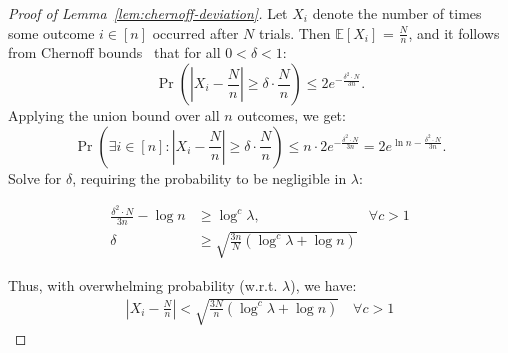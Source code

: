 \begin{proof}[Proof of Lemma~\ref{lem:chernoff-deviation}]

Let $X_i$ denote the number of times some outcome $i \in [n]$ occurred after $N$ trials. Then $\mathbb{E}[X_i]$ = $\frac{N}{n}$, and it follows from Chernoff bounds~\cite[Cor.~4.6]{MU05} that for all $0 < \delta < 1$:
$$
\Pr\left(|X_i - \frac{N}{n}| \geq \delta \cdot \frac{N}{n} \right) \leq 2 e^{-\frac{\delta^2 \cdot N}{3n}}.
$$
Applying the union bound over all $n$ outcomes, we get:
$$
\Pr\left(\exists i \in [n]: |X_i - \frac{N}{n}| \geq \delta \cdot \frac{N}{n} \right) \leq n \cdot 2 e^{-\frac{\delta^2 \cdot N}{3n}} = 2 e^{\ln n -\frac{\delta^2 \cdot N}{3n}}.
$$
Solve for $\delta$, requiring the probability to be negligible in $\lambda$:

\begin{align*}
\frac{\delta^2 \cdot N}{3n} - \log n &\geq \log^c \lambda, &\forall c > 1\\
\delta &\geq \sqrt{\frac{3n}{N}(\log^c \lambda + \log n)} &
\end{align*}

Thus, with overwhelming probability (w.r.t. $\lambda$), we have:
\begin{align*}
    \left|X_i - \frac{N}{n}\right| < \sqrt{\frac{3N}{n}(\log^c \lambda + \log n)} \quad \forall c > 1
\end{align*}

\end{proof}


